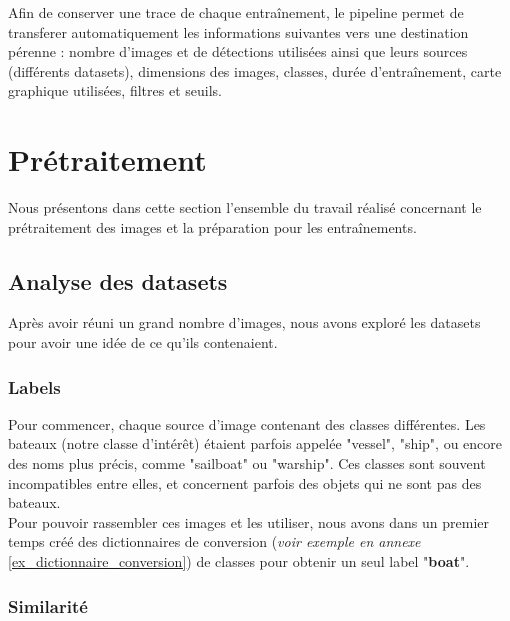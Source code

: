 Afin de conserver une trace de chaque entraînement, le pipeline permet de transferer automatiquement
les informations suivantes vers une destination pérenne : nombre d'images et de détections utilisées
ainsi que leurs sources (différents datasets), dimensions des images, classes, durée d'entraînement,
carte graphique utilisées, filtres et seuils. \\

\section{Prétraitement}

Nous présentons dans cette section l'ensemble du travail réalisé concernant le prétraitement des images
et la préparation pour les entraînements.

\subsection{Analyse des datasets}

Après avoir réuni un grand nombre d'images, nous avons exploré les datasets pour avoir une idée de ce qu'ils contenaient.

\subsubsection{Labels}

Pour commencer, chaque source d'image contenant des classes différentes. Les bateaux
(notre classe d'intérêt) étaient parfois appelée "vessel", "ship", ou encore des noms plus précis, comme "sailboat" ou "warship". Ces classes sont souvent incompatibles entre elles, 
et concernent parfois des objets qui ne sont pas des bateaux.\\

Pour pouvoir rassembler ces images et les utiliser, nous avons dans un premier temps
créé des dictionnaires de conversion (\textit{voir exemple en annexe }\ref{ex_dictionnaire_conversion}) de classes pour obtenir un seul label "\textbf{boat}".

\subsubsection{Similarité}
\label{similarite}

